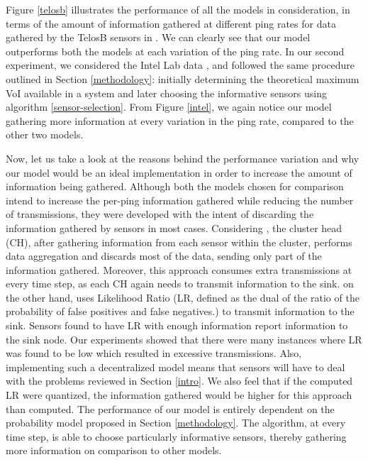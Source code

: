 Figure \ref{telosb} illustrates the performance of all the models in
consideration, in terms of the amount of information gathered at
different ping rates for data gathered by the TelosB sensors in
\cite{suthaharan2010labelled}. We can clearly see that our model
outperforms both the models at each variation of the ping rate. In our
second experiment, we considered the Intel Lab data
\cite{BodikGuestrinEtAl2004}, and followed the same procedure outlined
in Section \ref{methodology}: initially determining the theoretical
maximum VoI available in a system and later choosing the informative
sensors using algorithm \ref{sensor-selection}. From Figure
\ref{intel}, we again notice our model gathering more information at
every variation in the ping rate, compared to the other two models.

Now, let us take a look at the reasons behind the performance
variation and why our model would be an ideal implementation in order
to increase the amount of information being gathered. Although both
the models chosen for comparison intend to increase the per-ping
information gathered while reducing the number of transmissions, they
were developed with the intent of discarding the information gathered
by sensors in most cases. Considering
\cite{muruganathan2005centralized}, the cluster head (CH), after
gathering information from each sensor within the cluster, performs
data aggregation and discards most of the data, sending only part of
the information gathered.  Moreover, this approach consumes extra
transmissions at every time step, as each CH again needs to transmit
information to the sink. \cite{rago1996censoring} on the other hand,
uses Likelihood Ratio (LR, defined as the dual of the ratio of the probability of
false positives and false negatives.) %
to transmit information to the sink. Sensors found to have LR with enough
information report information to the sink node.  Our experiments
showed that there were many instances where LR was found to be low which
resulted in excessive transmissions. Also, implementing such a decentralized 
model means that sensors will have to deal with the problems reviewed in 
Section \ref{intro}.  We also feel that if the computed LR were quantized, 
the information gathered would be higher for this approach than computed. The 
performance of our model is entirely dependent on the probability model proposed 
in Section \ref{methodology}. The algorithm, at every time step, is able to choose 
particularly informative sensors, thereby gathering more information on comparison
to other models.

